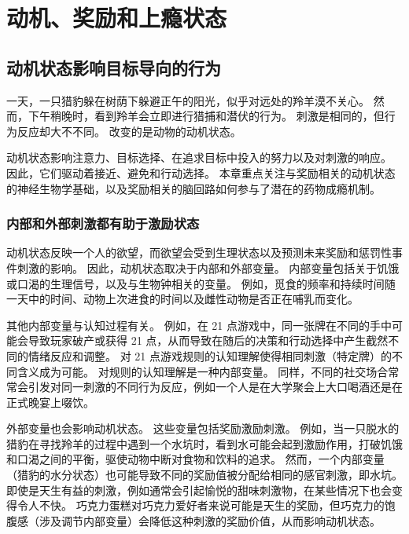 \chapter{动机、奖励和上瘾状态} \label{chap:chap43}

\section{动机状态影响目标导向的行为}

一天，一只猎豹躲在树荫下躲避正午的阳光，似乎对远处的羚羊漠不关心。
然而，下午稍晚时，看到羚羊会立即进行猎捕和潜伏的行为。
刺激是相同的，但行为反应却大不不同。
改变的是动物的动机状态。



动机状态影响注意力、目标选择、在追求目标中投入的努力以及对刺激的响应。
因此，它们驱动着接近、避免和行动选择。
本章重点关注与奖励相关的动机状态的神经生物学基础，以及奖励相关的脑回路如何参与了潜在的药物成瘾机制。



\subsection{内部和外部刺激都有助于激励状态}

动机状态反映一个人的欲望，而欲望会受到生理状态以及预测未来奖励和惩罚性事件刺激的影响。
因此，动机状态取决于内部和外部变量。
内部变量包括关于饥饿或口渴的生理信号，以及与生物钟相关的变量。
例如，觅食的频率和持续时间随一天中的时间、动物上次进食的时间以及雌性动物是否正在哺乳而变化。


其他内部变量与认知过程有关。
例如，在 21 点游戏中，同一张牌在不同的手中可能会导致玩家破产或获得 21 点，从而导致在随后的决策和行动选择中产生截然不同的情绪反应和调整。
对 21 点游戏规则的认知理解使得相同刺激（特定牌）的不同含义成为可能。
对规则的认知理解是一种内部变量。
同样，不同的社交场合常常会引发对同一刺激的不同行为反应，例如一个人是在大学聚会上大口喝酒还是在正式晚宴上啜饮。


外部变量也会影响动机状态。
这些变量包括奖励激励刺激。
例如，当一只脱水的猎豹在寻找羚羊的过程中遇到一个水坑时，看到水可能会起到激励作用，打破饥饿和口渴之间的平衡，驱使动物中断对食物和饮料的追求。
然而，一个内部变量（猎豹的水分状态）也可能导致不同的奖励值被分配给相同的感官刺激，即水坑。
即使是天生有益的刺激，例如通常会引起愉悦的甜味刺激物，在某些情况下也会变得令人不快。
巧克力蛋糕对巧克力爱好者来说可能是天生的奖励，但巧克力的饱腹感（涉及调节内部变量）会降低这种刺激的奖励价值，从而影响动机状态。



